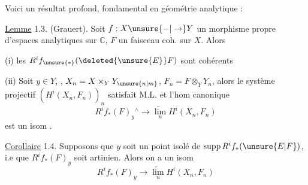 Voici un résultat  profond, fondamental
 en géométrie analytique :

\uline{Lemme} 1.3. (Grauert). Soit $f:X\unsure{-|\to}Y$ un
morphisme propre d'espaces analytiques sur $\mathbb C$,
$F$ un faisceau coh. sur $X$. Alors

(i) les $R^if_{\unsure{*}}(\deleted{\unsure{E}}F)$ sont cohérents

(ii) Soit $y\in Y$, ,
$X_n=X\times_Y Y_{\unsure{n|m}}$, $F_n=F\otimes_Y Y_n$, alors le système
projectif $(H^i(X_n,F_n))_n$ satisfait M.L.
et l'hom canonique
\[
R^if_*(F)_y{}^{\wedge}\longrightarrow\underset{n}{\underleftarrow{\lim}}H^i(X_n,F_n)
\]
est un isom .

\uline{Corollaire} 1.4. Supposons que
$y$ soit un point isolé de $\operatorname{supp} R^if_*(\unsure{E|F})$,
 i.e que $R^if_*(F)_y$ soit artinien.
Alors on a un isom
\[
R^if_*(F)_y\longrightarrow\underset{n}{\underleftarrow{\lim}}H^i(X_n,F_n)
\]
